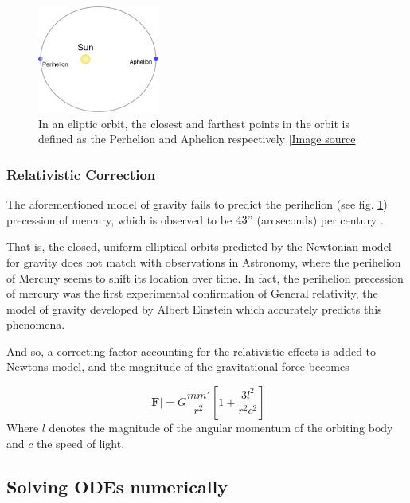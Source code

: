 \documentclass[10pt,showpacs,preprintnumbers,amsmath,amssymb,nofootinbib,aps,prl,twocolumn,groupedaddress,superscriptaddress,showkeys]{revtex4-1}
\begin{document}
      \begin{figure}[h!]
        \center
        \includegraphics[width=4cm]{figs/486px-Perihelion-Aphelion.png}
        \caption{In an eliptic orbit, the closest and farthest points in the orbit is defined as the Perhelion and Aphelion respectively [\href{https://en.wikipedia.org/wiki/Perihelion_and_aphelion}{Image source}]}
        \label{fig:perhelion}
      \end{figure}

    
    \subsubsection{Relativistic Correction}

      The aforementioned model of gravity fails to predict the perihelion (see fig. \ref{fig:perhelion}) precession of mercury, which is observed to be $43"$ (arcseconds) per century \cite{problem_set}. 

      That is, the closed, uniform elliptical orbits predicted by the Newtonian model for gravity does not match with observations in Astronomy, where the perihelion of Mercury seems to shift its location over time. In fact, the perihelion precession of mercury was the first experimental confirmation of General relativity, the model of gravity developed by Albert Einstein which accurately predicts this phenomena.

      And so, a correcting factor accounting for the relativistic effects is added to Newtons model, and the magnitude of the gravitational force becomes \cite{problem_set}

      \begin{equation}
        |\mathbf F| = G \frac{m m'}{r^2}\left[1 + \frac{3l^2}{r^2c^2}\right]
        \label{eqn:relativistic correction}
      \end{equation}
      Where $l$ denotes the magnitude of the angular momentum of the orbiting body and $c$ the speed of light.
\subsection{Solving ODEs numerically}
\end{document}
